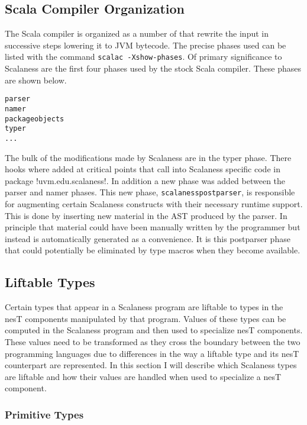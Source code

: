 \subsection{Scala Compiler Organization}
\label{section-scala-compiler-organization}

The Scala compiler is organized as a number of  that rewrite the input in
successive steps lowering it to JVM bytecode. The precise phases used can be listed with the
command \texttt{scalac -Xshow-phases}. Of primary significance to Scalaness are the first four
phases used by the stock Scala compiler. These phases are shown below.

\singlespace
\begin{Verbatim}
parser
namer
packageobjects
typer
...
\end{Verbatim}
\primaryspacing

The bulk of the modifications made by Scalaness are in the typer phase. There hooks where added
at critical points that call into Scalaness specific code in package !uvm.edu.scalaness!. In
addition a new phase was added between the parser and namer phases. This new phase,
\texttt{scalanesspostparser}, is responsible for augmenting certain Scalaness constructs with
their necessary runtime support. This is done by inserting new material in the AST produced by
the parser. In principle that material could have been manually written by the programmer but
instead is automatically generated as a convenience. It is this postparser phase that could
potentially be eliminated by type macros when they become available.

\subsection{Liftable Types}
\label{section-liftable-types}

Certain types that appear in a Scalaness program are liftable to types in the nesT components
manipulated by that program. Values of these types can be computed in the Scalaness program and
then used to specialize nesT components. These values need to be transformed as they cross the
boundary between the two programming languages due to differences in the way a liftable type and
its nesT counterpart are represented. In this section I will describe which Scalaness types are
liftable and how their values are handled when used to specialize a nesT component.

\subsubsection{Primitive Types}
\label{section-liftable-primitives}

